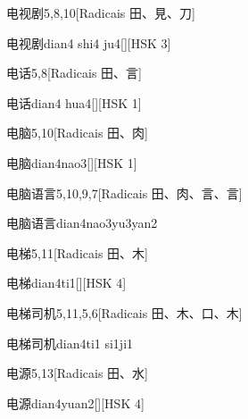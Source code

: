 \begin{entry}{电视剧}{5,8,10}[Radicais ⽥、⾒、⼑]
  \begin{phonetics}{电视剧}{dian4 shi4 ju4}[][HSK 3]
  \end{phonetics}
\end{entry}

\begin{entry}{电话}{5,8}[Radicais ⽥、⾔]
  \begin{phonetics}{电话}{dian4 hua4}[][HSK 1]
  \end{phonetics}
\end{entry}

\begin{entry}{电脑}{5,10}[Radicais ⽥、⾁]
  \begin{phonetics}{电脑}{dian4nao3}[][HSK 1]
  \end{phonetics}
\end{entry}

\begin{entry}{电脑语言}{5,10,9,7}[Radicais ⽥、⾁、⾔、⾔]
  \begin{phonetics}{电脑语言}{dian4nao3yu3yan2}
  \end{phonetics}
\end{entry}

\begin{entry}{电梯}{5,11}[Radicais ⽥、⽊]
  \begin{phonetics}{电梯}{dian4ti1}[][HSK 4]
  \end{phonetics}
\end{entry}

\begin{entry}{电梯司机}{5,11,5,6}[Radicais ⽥、⽊、⼝、⽊]
  \begin{phonetics}{电梯司机}{dian4ti1 si1ji1}
  \end{phonetics}
\end{entry}

\begin{entry}{电源}{5,13}[Radicais ⽥、⽔]
  \begin{phonetics}{电源}{dian4yuan2}[][HSK 4]
  \end{phonetics}
\end{entry}


